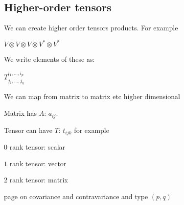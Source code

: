 
\subsection{Higher-order tensors}

We can create higher order tensors products. For example

\(V\otimes V \otimes V\otimes V^* \otimes V^*\)

We write elements of these as:

\(T_{j_1,...,j_q}^{i_1,...,i_p}\)

We can map from matrix to matrix etc higher dimensional

Matrix has \(A\): \(a_{ij}\).

Tensor can have \(T\): \(t_{ijk}\) for example

\(0\) rank tensor: scalar

\(1\) rank tensor: vector

\(2\) rank tensor: matrix

page on covariance and contravariance and type \((p,q)\)


